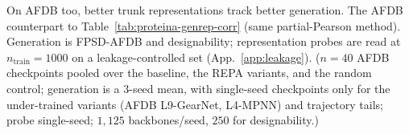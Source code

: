 \begin{table}[tbp]
\centering
\small

\caption{On AFDB too, better trunk representations track better generation. The AFDB counterpart to Table~\ref{tab:proteina-genrep-corr} (same partial-Pearson method). Generation is FPSD-AFDB and designability; representation probes are read at $n_\text{train}{=}1000$ on a leakage-controlled set (App.~\ref{app:leakage}). ($n{=}40$ AFDB checkpoints pooled over the baseline, the REPA variants, and the random control; generation is a $3$-seed mean, with single-seed checkpoints only for the under-trained variants (AFDB L9-GearNet, L4-MPNN) and trajectory tails; probe single-seed; $1{,}125$ backbones/seed, $250$ for designability.)}
\label{tab:proteina-genrep-corr-afdb}
\end{table}
